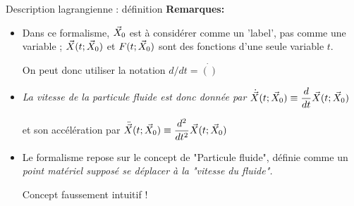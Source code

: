 \begin{frame}{Description lagrangienne : définition}
{\bf Remarques:}

\begin{itemize}
\item
Dans ce formalisme, $\vec{X}_0$ est à considérer comme un 'label', pas comme une variable ; $\vec{X}(t ; \vec{X}_0)$ et $F(t ; \vec{X}_0)$ sont des fonctions d'une seule variable $t$. 

On peut donc utiliser la notation $d/dt = \dot{()}$ 

\pause 
\item 
{\color{bleu} \tiny

\slshape
La vitesse de la particule fluide est donc donnée par 
$\dot{\vec{X}}(t; \vec{X}_0) \equiv \displaystyle \frac{d }{dt}\vec{X}(t; \vec{X}_0)$


\hspace{24mm} et son accélération par 
$\displaystyle \ddot{\vec{X}}(t; \vec{X}_0) \equiv \frac{ d^2 }{d t^2}\vec{X}(t; \vec{X}_0)$
}


\pause
\item Le formalisme repose sur le concept de "Particule fluide", définie comme un {\em point matériel supposé se déplacer à la "vitesse du fluide". }

Concept faussement intuitif !

\end{itemize}

\vspace{0mm}

\end{frame}

